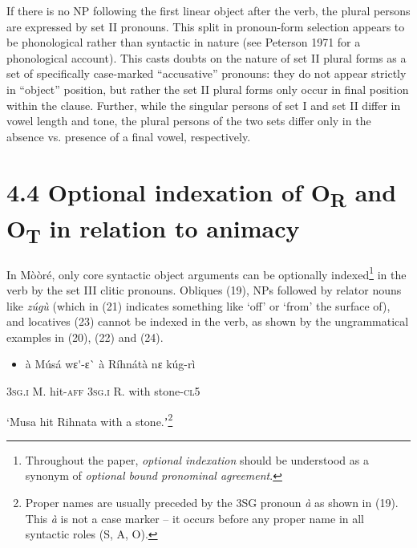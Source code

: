 \documentclass[output=paper]{langsci/langscibook}
\begin{document}
{{If there is no NP following the first linear object after the verb, the plural persons are expressed by set II pronouns. This split in pronoun-form selection appears to be phonological rather than syntactic in nature (see Peterson 1971 for a phonological account). This casts doubts on the nature of set II plural forms as a set of specifically case-marked “accusative” pronouns: they do not appear strictly in “object” position, but rather the set II plural forms only occur in final position within the clause. Further, while the singular persons of set I and set II differ in vowel length and tone, the plural persons of the two sets differ only in the absence vs. presence of a final vowel, respectively. 

\section{4.4 Optional indexation of O\textsubscript{R} and O\textsubscript{T} in relation to animacy}

In M\`{o}\`{o}r\'{e}, only core syntactic object arguments can be optionally indexed\footnote{ Throughout the paper, \textit{optional indexation} should be understood as a synonym of \textit{optional bound pronominal agreement}. }{ }in the verb by the set III clitic pronouns. Obliques (19), NPs followed by relator nouns like \emph{z\'{u}g\`{u}} (which in (21) indicates something like ‘off’ or ‘from’ the surface of), and locatives (23) cannot be indexed in the verb, as shown by the ungrammatical examples in (20), (22) and (24). 

\begin{itemize}
\item \begin{styleNumberedEX}
\label{bkm:Ref424201679}\`{a}    M\'{u}s\'{a}    wɛ\'{ }-ɛ\`{ }    \`{a}    R\'{i}hn\'{a}t\`{a}  nɛ  k\'{u}g-r\`{i}
\end{styleNumberedEX}\end{itemize}
\begin{styleGloss}
\textsc{3sg.i  }  M.    hit-\textsc{aff  3sg.i  }  R.    with  stone-\textsc{cl5}
\end{styleGloss}

\begin{styleTranslation}
‘Musa hit Rihnata with a stone.ʼ\footnote{ Proper names are usually preceded by the 3SG pronoun\textit{ \`{a}} as shown in (19). This \textit{\`{a}} is not a case marker – it occurs before any proper name in all syntactic roles (S, A, O).}
\end{styleTranslation}

}}
\end{document}
